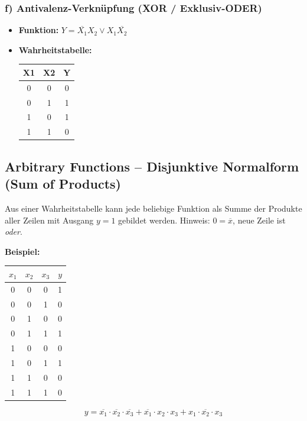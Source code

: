 \documentclass[11pt,a4paper]{article}
\begin{document}
\subsubsection{f) Antivalenz-Verknüpfung (XOR / Exklusiv-ODER)}
\begin{itemize}
    \item \textbf{Funktion:} $Y = \overline{X_1} X_2 \vee X_1 \overline{X_2}$
    \item \textbf{Wahrheitstabelle:}
    \begin{center}
    \begin{tabular}{ccc}
        \toprule
        X1 & X2 & Y \\ \midrule
        0 & 0 & 0 \\
        0 & 1 & 1 \\
        1 & 0 & 1 \\
        1 & 1 & 0 \\ \bottomrule
    \end{tabular}
    \end{center}
\end{itemize}

\subsection{Arbitrary Functions -- Disjunktive Normalform (Sum of Products)}
Aus einer Wahrheitstabelle kann jede beliebige Funktion als Summe der Produkte aller Zeilen mit Ausgang $y=1$ gebildet werden. Hinweis: $0 = \overline{x}$, neue Zeile ist \emph{oder}.

\textbf{Beispiel:}
\begin{center}
\begin{tabular}{cccc}
    \toprule
    $x_1$ & $x_2$ & $x_3$ & $y$ \\ \midrule
    0 & 0 & 0 & 1 \\
    0 & 0 & 1 & 0 \\
    0 & 1 & 0 & 0 \\
    0 & 1 & 1 & 1 \\
    1 & 0 & 0 & 0 \\
    1 & 0 & 1 & 1 \\
    1 & 1 & 0 & 0 \\
    1 & 1 & 1 & 0 \\ \bottomrule
\end{tabular}
\end{center}
$$y = \overline{x_1}\cdot\overline{x_2}\cdot\overline{x_3} + \overline{x_1}\cdot x_2\cdot x_3 + x_1\cdot\overline{x_2}\cdot x_3$$
\end{document}
